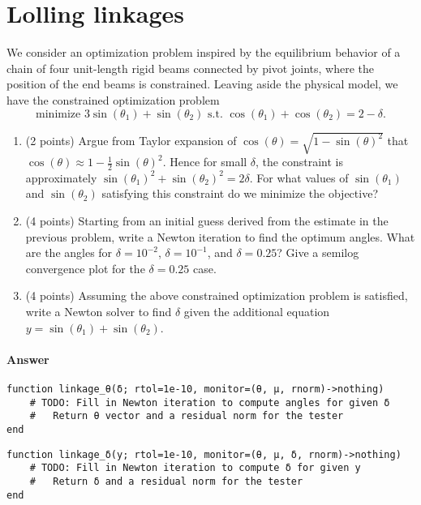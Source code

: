 \documentclass[12pt, leqno]{article} %
\providecommand{\tightlist}{%
  \setlength{\itemsep}{0pt}\setlength{\parskip}{0pt}}
\begin{document}
\section{Lolling linkages}

We consider an optimization problem inspired by the equilibrium behavior
of a chain of four unit-length rigid beams connected by pivot joints,
where the position of the end beams is constrained. Leaving aside the
physical model, we have the constrained optimization problem
\[\mbox{minimize } 3 \sin(\theta_1) + \sin(\theta_2)
  \mbox{ s.t. } \cos(\theta_1) + \cos(\theta_2) = 2 - \delta.\]

\begin{enumerate}
\def\labelenumi{\arabic{enumi}.}
\tightlist
\item
  (2 points) Argue from Taylor expansion of
  \(\cos(\theta) = \sqrt{1-\sin(\theta)^2}\) that
  \(\cos(\theta) \approx 1 - \frac{1}{2} \sin(\theta)^2\). Hence for
  small \(\delta\), the constraint is approximately
  \(\sin(\theta_1)^2 + \sin(\theta_2)^2 = 2 \delta\). For what values of
  \(\sin(\theta_1)\) and \(\sin(\theta_2)\) satisfying this constraint
  do we minimize the objective?
\item
  (4 points) Starting from an initial guess derived from the estimate in
  the previous problem, write a Newton iteration to find the optimum
  angles. What are the angles for \(\delta = 10^{-2}\),
  \(\delta = 10^{-1}\), and \(\delta = 0.25\)? Give a semilog
  convergence plot for the \(\delta = 0.25\) case.
\item
  (4 points) Assuming the above constrained optimization problem is
  satisfied, write a Newton solver to find \(\delta\) given the
  additional equation \(y = \sin(\theta_1) + \sin(\theta_2)\).
\end{enumerate}

\paragraph{Answer}

\begin{verbatim}
function linkage_θ(δ; rtol=1e-10, monitor=(θ, μ, rnorm)->nothing)
    # TODO: Fill in Newton iteration to compute angles for given δ
    #   Return θ vector and a residual norm for the tester    
end
\end{verbatim}

\begin{verbatim}
function linkage_δ(y; rtol=1e-10, monitor=(θ, μ, δ, rnorm)->nothing)
    # TODO: Fill in Newton iteration to compute δ for given y
    #   Return δ and a residual norm for the tester
end
\end{verbatim}
\end{document}
